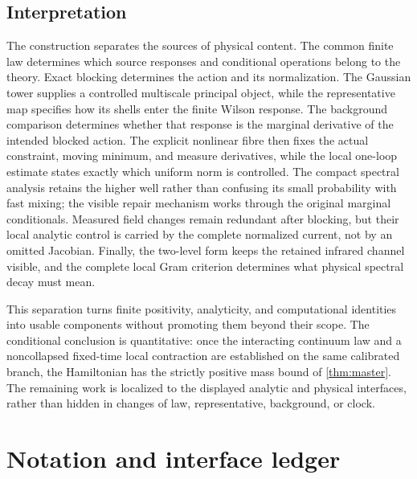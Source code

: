 \documentclass[11pt,oneside,openany]{book}
\theoremstyle{definition}
\theoremstyle{remark}
\begin{document}
\section{Interpretation}
The construction separates the sources of physical content. The common
finite law determines which source responses and conditional operations
belong to the theory. Exact blocking determines the action and its
normalization. The Gaussian tower supplies a controlled multiscale
principal object, while the representative map specifies how its shells
enter the finite Wilson response. The background comparison determines
whether that response is the marginal derivative of the intended
blocked action. The explicit nonlinear fibre then fixes the actual
constraint, moving minimum, and measure derivatives, while the local
one-loop estimate states exactly which uniform norm is controlled.
The compact spectral analysis retains the higher well rather than
confusing its small probability with fast mixing; the visible repair
mechanism works through the original marginal conditionals. Measured field changes remain redundant after blocking,
but their local analytic control is carried by the complete normalized
current, not by an omitted Jacobian. Finally, the two-level form keeps
the retained infrared channel visible, and the complete local Gram
criterion determines what physical spectral decay must mean.

This separation turns finite positivity, analyticity, and computational
identities into usable components without promoting them beyond their
scope. The conditional conclusion is quantitative: once the interacting
continuum law and a noncollapsed fixed-time local contraction are
established on the same calibrated branch, the Hamiltonian has the
strictly positive mass bound of \cref{thm:master}. The remaining work is
localized to the displayed analytic and physical interfaces, rather than
hidden in changes of law, representative, background, or clock.

\appendix
\chapter{Notation and interface ledger}
\label{app:notation}
\end{document}
